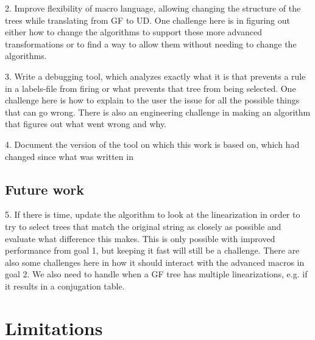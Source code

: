 \documentclass{article}
\begin{document}
2. Improve flexibility of macro language, allowing changing the structure of the trees while translating from GF to UD. One challenge here is in figuring out either how to change the algorithms to support these more advanced transformations or to find a way to allow them without needing to change the algorithms.

3. Write a debugging tool, which analyzes exactly what it is that prevents a rule in a labels-file from firing or what prevents that tree from being selected.
One challenge here is how to explain to the user the issue for all the possible things that can go wrong.
There is also an engineering challenge in making an algorithm that figures out what went wrong and why.

4. Document the version of the tool on which this work is based on, which had changed since what was written in \cite{kolachina-ranta-2017}

\subsection{Future work}

5. If there is time, update the algorithm to look at the linearization in order to try to select trees that match the original string as closely as possible and evaluate what difference this makes. This is only possible with improved performance from goal 1, but keeping it fast will still be a challenge. There are also some challenges here in how it should interact with the advanced macros in goal 2. We also need to handle when a GF tree has multiple linearizations, e.g. if it results in a conjugation table.




\section{Limitations}
\end{document}
